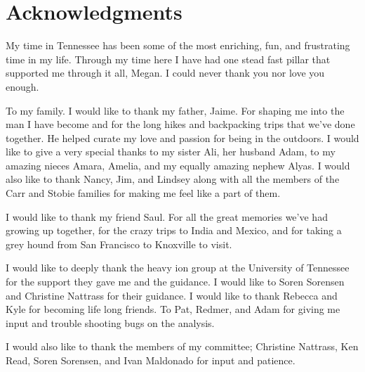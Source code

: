 \chapter*{Acknowledgments}\label{ch:acknowledgments}
My time in Tennessee has been some of the most enriching, fun, and frustrating time in my life.  Through my time here I have had one stead fast pillar that supported me through it all, Megan.  I could never thank you nor love you enough.

\par
To my family. I would like to thank my father, Jaime.  For shaping me into the man I have become and for the long hikes and backpacking trips that we've done together.  He helped curate my love and passion for being in the outdoors.  I would like to give a very special thanks to my sister Ali, her husband Adam, to my amazing nieces Amara, Amelia, and my equally amazing nephew Alyas.  I would also like to thank Nancy, Jim, and Lindsey along with all the members of the Carr and Stobie families for making me feel like a part of them.  

\par
I would like to thank my friend Saul.  For all the great memories we've had growing up together, for the crazy trips to India and Mexico, and for taking a grey hound from San Francisco to Knoxville to visit.  

\par
I would like to deeply thank the heavy ion group at the University of Tennessee for the support they gave me and the guidance.  I would like to Soren Sorensen and Christine Nattrass for their guidance.  I would like to thank Rebecca and Kyle for becoming life long friends.  To Pat, Redmer, and Adam for giving me input and trouble shooting bugs on the analysis.

\par 
I would also like to thank the members of my committee; Christine Nattrass, Ken Read, Soren Sorensen, and Ivan Maldonado for input and patience. 

